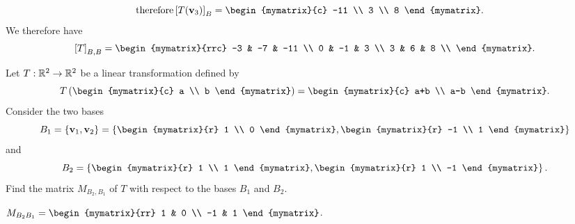 \begin{ex}
\begin{sol}
\begin{enumerate}
\begin{equation*}
          \quad\mbox{therefore}
          \coord{T(\vect{v}_3)}_B =
          \begin{mymatrix}{c} -11 \\ 3 \\ 8 \end{mymatrix}.
        \end{equation*}
        We therefore have
        \begin{equation*}
          \coord{T}_{B,B} = 
          \begin{mymatrix}{rrc}
            -3 & -7 & -11 \\
            0  & -1 &   3 \\
            3  &  6 &   8 \\
          \end{mymatrix}.
        \end{equation*}
      \end{enumerate}
\end{sol}
\end{ex}

\begin{ex}
  Let $T: \mathbb{R}^2 \to \mathbb{R}^2$ be a linear transformation defined by
  \begin{equation*}
    T \paren{\begin{mymatrix}{c} a \\ b \end{mymatrix}}
    = \begin{mymatrix}{c} a+b \\ a-b \end{mymatrix}.
  \end{equation*}
  Consider the two bases
  \begin{equation*}
    B_1 = \set{\vect{v}_1, \vect{v}_2}
    = \set{\begin{mymatrix}{r} 1 \\ 0 \end{mymatrix},
      \begin{mymatrix}{r} -1 \\ 1 \end{mymatrix}
    }
  \end{equation*}
  and
  \begin{equation*}
    B_2 = \set{\begin{mymatrix}{r} 1 \\ 1 \end{mymatrix},
      \begin{mymatrix}{r} 1 \\ -1 \end{mymatrix}
    }.
  \end{equation*}
  Find the matrix $M_{B_2,B_1}$ of $T$ with respect to the bases $B_1$
  and $B_2$.
  \begin{sol}
    $M_{B_2 B_1} = \begin{mymatrix}{rr}
      1 & 0 \\
      -1 & 1
    \end{mymatrix}$.
  \end{sol}
\end{ex}

